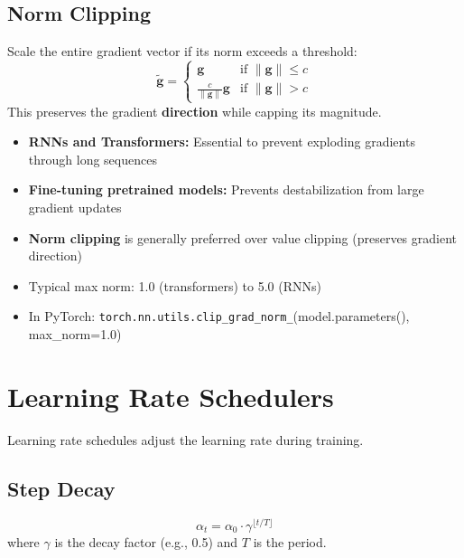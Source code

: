 \subsection{Norm Clipping}

Scale the entire gradient vector if its norm exceeds a threshold:
\begin{equation}
\tilde{\mathbf{g}} = \begin{cases}
\mathbf{g} & \text{if } \|\mathbf{g}\| \leq c \\
\frac{c}{\|\mathbf{g}\|} \mathbf{g} & \text{if } \|\mathbf{g}\| > c
\end{cases}
\end{equation}
This preserves the gradient \textbf{direction} while capping its magnitude.

\begin{properties}
\begin{itemize}
    \item \textbf{RNNs and Transformers:} Essential to prevent exploding gradients through long sequences
    \item \textbf{Fine-tuning pretrained models:} Prevents destabilization from large gradient updates
    \item \textbf{Norm clipping} is generally preferred over value clipping (preserves gradient direction)
    \item Typical max norm: 1.0 (transformers) to 5.0 (RNNs)
    \item In PyTorch: \texttt{torch.nn.utils.clip\_grad\_norm\_}(model.parameters(), max\_norm=1.0)
\end{itemize}
\end{properties}

\section{Learning Rate Schedulers}

Learning rate schedules adjust the learning rate during training.

\subsection{Step Decay}

\begin{equation}
\alpha_t = \alpha_0 \cdot \gamma^{\lfloor t / T \rfloor}
\end{equation}
where $\gamma$ is the decay factor (e.g., 0.5) and $T$ is the period.

